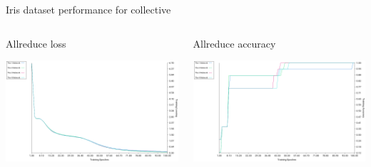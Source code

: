 \documentclass[presentation]{beamer}
\begin{document}
\begin{frame}[label={sec:org62ce37e}]{Iris dataset performance for collective}
\begin{columns}
\begin{column}{0.6\columnwidth}
\begin{block}{Allreduce loss}
\begin{center}
\includegraphics[width=.9\linewidth]{./png/iris_allreduce_loss.png}
\end{center}
\end{block}
\end{column}
\begin{column}{0.6\columnwidth}
\begin{block}{Allreduce accuracy}
\begin{center}
\includegraphics[width=.9\linewidth]{./png/iris_allreduce_accuracy.png}
\end{center}
\end{block}
\end{column}
\end{columns}
\end{frame}
\end{document}
